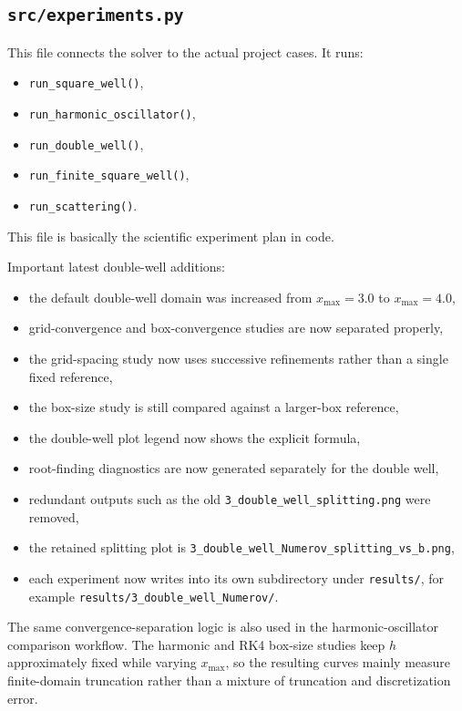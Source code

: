 \documentclass[11pt]{article}
\begin{document}
    \subsection{\texttt{src/experiments.py}}

    This file connects the solver to the actual project cases. It runs:
    \begin{itemize}
        \item \texttt{run\_square\_well()},
        \item \texttt{run\_harmonic\_oscillator()},
        \item \texttt{run\_double\_well()},
        \item \texttt{run\_finite\_square\_well()},
        \item \texttt{run\_scattering()}.
    \end{itemize}

    This file is basically the scientific experiment plan in code.

    Important latest double-well additions:
    \begin{itemize}
        \item the default double-well domain was increased from $x_{\max}=3.0$ to $x_{\max}=4.0$,
        \item grid-convergence and box-convergence studies are now separated properly,
        \item the grid-spacing study now uses successive refinements rather than a single fixed reference,
        \item the box-size study is still compared against a larger-box reference,
        \item the double-well plot legend now shows the explicit formula,
        \item root-finding diagnostics are now generated separately for the double well,
        \item redundant outputs such as the old \texttt{3\_double\_well\_splitting.png} were removed,
        \item the retained splitting plot is \texttt{3\_double\_well\_Numerov\_splitting\_vs\_b.png},
        \item each experiment now writes into its own subdirectory under \texttt{results/}, for example \texttt{results/3\_double\_well\_Numerov/}.
    \end{itemize}

    The same convergence-separation logic is also used in the harmonic-oscillator comparison workflow. The harmonic and RK4 box-size studies keep $h$ approximately fixed while varying $x_{\max}$, so the resulting curves mainly measure finite-domain truncation rather than a mixture of truncation and discretization error.
\end{document}
